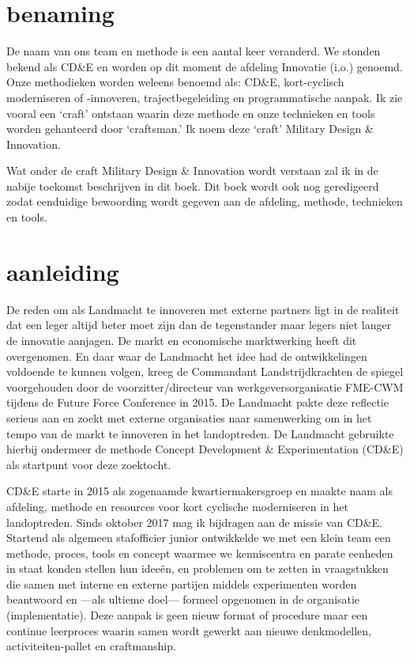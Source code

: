 \documentclass[
]{book}
\begin{document}
\hypertarget{benaming}{%
\section{benaming}\label{benaming}}

De naam van ons team en methode is een aantal keer veranderd. We stonden bekend als CD\&E en worden op dit moment de afdeling Innovatie (i.o.) genoemd. Onze methodieken worden weleens benoemd als: CD\&E, kort-cyclisch moderniseren of -innoveren, trajectbegeleiding en programmatische aanpak. Ik zie vooral een `craft' ontstaan waarin deze methode en onze technieken en tools worden gehanteerd door `craftsman.' Ik noem deze `craft' Military Design \& Innovation.

Wat onder de craft Military Design \& Innovation wordt verstaan zal ik in de nabije toekomst beschrijven in dit boek. Dit boek wordt ook nog geredigeerd zodat eenduidige bewoording wordt gegeven aan de afdeling, methode, technieken en tools.

\hypertarget{aanleiding}{%
\section{aanleiding}\label{aanleiding}}

De reden om als Landmacht te innoveren met externe partners ligt in de realiteit dat een leger altijd beter moet zijn dan de tegenstander maar legers niet langer de innovatie aanjagen. De markt en economische marktwerking heeft dit overgenomen. En daar waar de Landmacht het idee had de ontwikkelingen voldoende te kunnen volgen, kreeg de Commandant Landstrijdkrachten de spiegel voorgehouden door de voorzitter/directeur van werkgeversorganisatie FME-CWM tijdens de Future Force Conference in 2015. De Landmacht pakte deze reflectie serieus aan en zoekt met externe organisaties naar samenwerking om in het tempo van de markt te innoveren in het landoptreden. De Landmacht gebruikte hierbij ondermeer de methode Concept Development \& Experimentation (CD\&E) als startpunt voor deze zoektocht.

CD\&E starte in 2015 als zogenaamde kwartiermakersgroep en maakte naam als afdeling, methode en resources voor kort cyclische moderniseren in het landoptreden. Sinds oktober 2017 mag ik bijdragen aan de missie van CD\&E. Startend als algemeen stafofficier junior ontwikkelde we met een klein team een methode, proces, tools en concept waarmee we kenniscentra en parate eenheden in staat konden stellen hun ideeën, en problemen om te zetten in vraagstukken die samen met interne en externe partijen middels experimenten worden beantwoord en ---als ultieme doel--- formeel opgenomen in de organisatie (implementatie). Deze aanpak is geen nieuw format of procedure maar een continue leerproces waarin samen wordt gewerkt aan nieuwe denkmodellen, activiteiten-pallet en craftmanship.
\end{document}
